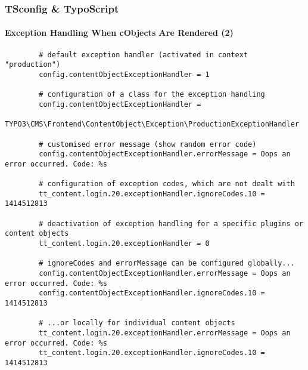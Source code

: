 \begin{frame}[fragile]
	\frametitle{TSconfig \& TypoScript}
	\framesubtitle{Exception Handling When cObjects Are Rendered (2)}
	
	\lstset{
		basicstyle=\tiny\ttfamily
	}
	
	\begin{lstlisting}
		# default exception handler (activated in context "production")
		config.contentObjectExceptionHandler = 1

		# configuration of a class for the exception handling
		config.contentObjectExceptionHandler =
		  TYPO3\CMS\Frontend\ContentObject\Exception\ProductionExceptionHandler

		# customised error message (show random error code)
		config.contentObjectExceptionHandler.errorMessage = Oops an error occurred. Code: %s

		# configuration of exception codes, which are not dealt with
		tt_content.login.20.exceptionHandler.ignoreCodes.10 = 1414512813

		# deactivation of exception handling for a specific plugins or content objects
		tt_content.login.20.exceptionHandler = 0

		# ignoreCodes and errorMessage can be configured globally...
		config.contentObjectExceptionHandler.errorMessage = Oops an error occurred. Code: %s
		config.contentObjectExceptionHandler.ignoreCodes.10 = 1414512813

		# ...or locally for individual content objects
		tt_content.login.20.exceptionHandler.errorMessage = Oops an error occurred. Code: %s
		tt_content.login.20.exceptionHandler.ignoreCodes.10 = 1414512813
	\end{lstlisting}

\end{frame}

